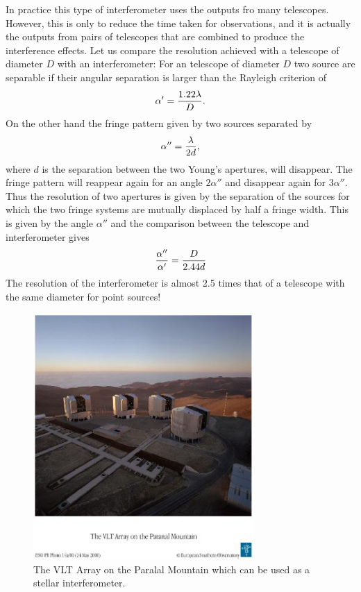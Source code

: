 In practice this type of interferometer uses the outputs fro many telescopes. However, this is only to reduce the time taken for observations, and it is actually the outputs from pairs of telescopes that are combined to produce the interference effects. Let us compare the resolution achieved with a telescope of diameter $D$ with an interferometer: For an telescope of diameter $D$ two source are separable if their angular separation is larger than the Rayleigh criterion of
\[ 
\alpha'={1.22\lambda\over D}.
\]
\noindent
On the other hand the fringe pattern given by two sources separated by 
\[
\alpha''={\lambda\over 2d},
\]
\noindent
where $d$ is the separation between the two Young's apertures, will disappear. The fringe pattern will reappear again for an angle $2\alpha''$ and disappear again for $3\alpha''$. Thus the resolution of two apertures is given by the separation of the sources for which the two fringe systems are mutually displaced by half a fringe width. This is given by the angle $\alpha''$ and the comparison between the telescope and interferometer gives
\[
{\alpha''\over\alpha'}={D\over 2.44d}
\]
\noindent
The resolution of the interferometer is almost 2.5 times that of a telescope with the same diameter for point sources! 

\begin{figure}[h]
  \centering
	\includegraphics[width=0.75\textwidth]{vlt-image-smallsize.eps}
  \caption{The VLT Array on the Paralal Mountain which can be used as a stellar interferometer.}
  \label{fig:vlt-array}
\end{figure}

